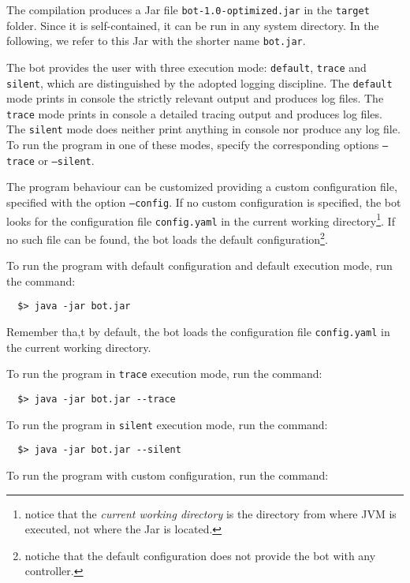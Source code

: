The compilation produces a Jar file \texttt{bot-1.0-optimized.jar} in the \texttt{target} folder. Since it is self-contained, it can be run in any system directory. In the following, we refer to this Jar with the shorter name \texttt{bot.jar}.

The bot provides the user with three execution mode: \texttt{default}, \texttt{trace} and \texttt{silent}, which are distinguished by the adopted logging discipline. The \texttt{default} mode prints in console the strictly relevant output and produces log files. The \texttt{trace} mode prints in console a detailed tracing output and produces log files. The \texttt{silent} mode does neither print anything in console nor produce any log file.
To run the program in one of these modes, specify the corresponding options \texttt{--trace} or \texttt{--silent}.

The program behaviour can be customized providing a custom configuration file, specified with the option \texttt{--config}.
If no custom configuration is specified, the bot looks for the configuration file \texttt{config.yaml} in the current working directory\footnote{notice that the \textit{current working directory} is the directory from where JVM is executed, not where the Jar is located.}. If no such file can be found, the bot loads the default configuration\footnote{notiche that the default configuration does not provide the bot with any controller.}.

To run the program with default configuration and default execution mode, run the command:

\begin{verbatim}
  $> java -jar bot.jar
\end{verbatim}

Remember tha,t by default, the bot loads the configuration file \texttt{config.yaml} in the current working directory.

To run the program in \texttt{trace} execution mode, run the command:

\begin{verbatim}
  $> java -jar bot.jar --trace
\end{verbatim}

To run the program in \texttt{silent} execution mode, run the command:

\begin{verbatim}
  $> java -jar bot.jar --silent
\end{verbatim}

To run the program with custom configuration, run the command:

